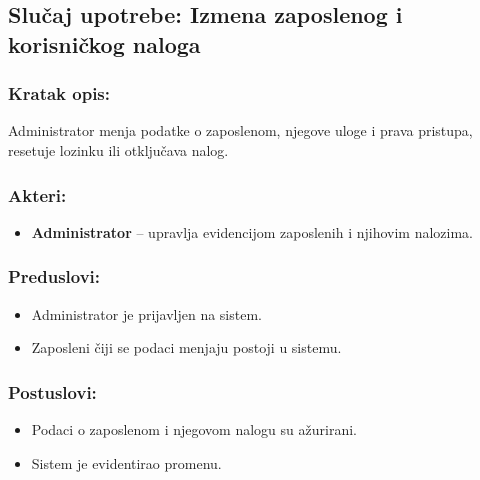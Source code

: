 \subsection{Slučaj upotrebe: Izmena zaposlenog i korisničkog naloga}

\subsubsection*{Kratak opis:}

Administrator menja podatke o zaposlenom, njegove uloge i prava pristupa, resetuje lozinku ili otključava nalog.

\subsubsection*{Akteri:}
\begin{itemize}
	\item \textbf{Administrator} -- upravlja evidencijom zaposlenih i njihovim nalozima.
\end{itemize}

\subsubsection*{Preduslovi:}
\begin{itemize}
	\item Administrator je prijavljen na sistem.
	\item Zaposleni čiji se podaci menjaju postoji u sistemu.
\end{itemize}

\subsubsection*{Postuslovi:}
\begin{itemize}
	\item Podaci o zaposlenom i njegovom nalogu su ažurirani.
	\item Sistem je evidentirao promenu.
\end{itemize}

